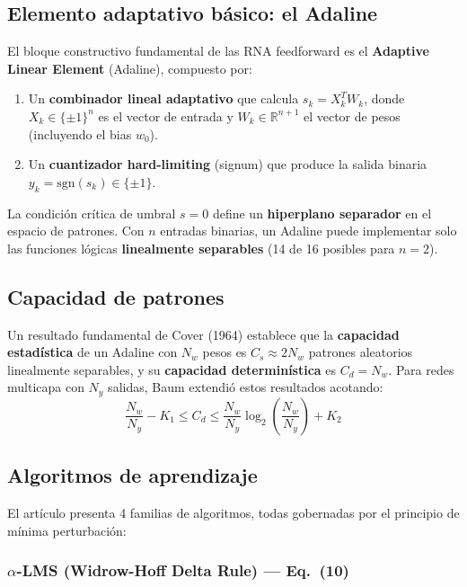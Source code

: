 \documentclass[12pt,a4paper]{article}
\newcommand{\R}{\mathbb{R}}
\begin{document}
\subsection{Elemento adaptativo básico: el Adaline}

El bloque constructivo fundamental de las RNA feedforward es el \textbf{Adaptive Linear Element} (Adaline), compuesto por:

\begin{enumerate}[leftmargin=*]
    \item Un \textbf{combinador lineal adaptativo} que calcula $s_k = X_k^T W_k$, donde $X_k \in \{\pm1\}^n$ es el vector de entrada y $W_k \in \R^{n+1}$ el vector de pesos (incluyendo el bias $w_0$).
    \item Un \textbf{cuantizador hard-limiting} (signum) que produce la salida binaria $y_k = \mathrm{sgn}(s_k) \in \{\pm1\}$.
\end{enumerate}

La condición crítica de umbral $s = 0$ define un \textbf{hiperplano separador} en el espacio de patrones. Con $n$ entradas binarias, un Adaline puede implementar solo las funciones lógicas \textbf{linealmente separables} (14 de 16 posibles para $n=2$).

\subsection{Capacidad de patrones}

Un resultado fundamental de Cover (1964) establece que la \textbf{capacidad estadística} de un Adaline con $N_w$ pesos es $C_s \approx 2N_w$ patrones aleatorios linealmente separables, y su \textbf{capacidad determinística} es $C_d = N_w$. Para redes multicapa con $N_y$ salidas, Baum extendió estos resultados acotando:
\[
\frac{N_w}{N_y} - K_1 \leq C_d \leq \frac{N_w}{N_y} \log_2\!\left(\frac{N_w}{N_y}\right) + K_2
\]

\subsection{Algoritmos de aprendizaje}

El artículo presenta 4 familias de algoritmos, todas gobernadas por el principio de mínima perturbación:

\subsubsection{$\alpha$-LMS (Widrow-Hoff Delta Rule) — Eq.~(10)}
\end{document}
